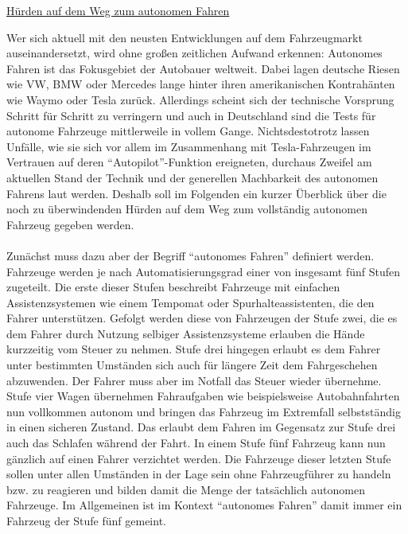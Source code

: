 \documentclass[10pt,a4paper]{article}
\begin{document}
\noindent
\begin{center}
\begin{huge}
\underline{Hürden auf dem Weg zum autonomen Fahren}
\end{huge}
\end{center}
\vspace{10mm}
\noindent
Wer sich aktuell mit den neusten Entwicklungen auf dem Fahrzeugmarkt auseinandersetzt, wird ohne großen zeitlichen Aufwand erkennen: Autonomes Fahren ist das Fokusgebiet der Autobauer weltweit. Dabei lagen deutsche Riesen wie VW, BMW oder Mercedes lange hinter ihren amerikanischen Kontrahänten wie Waymo oder Tesla zurück. Allerdings scheint sich der technische Vorsprung Schritt für Schritt zu verringern und auch in Deutschland sind die Tests für autonome Fahrzeuge mittlerweile in vollem Gange. Nichtsdestotrotz lassen Unfälle, wie sie sich vor allem im Zusammenhang mit Tesla-Fahrzeugen im Vertrauen auf deren ``Autopilot''-Funktion ereigneten, durchaus Zweifel am aktuellen Stand der Technik und der generellen Machbarkeit des autonomen Fahrens laut werden. Deshalb soll im Folgenden ein kurzer Überblick über die noch zu überwindenden Hürden auf dem Weg zum vollständig autonomen Fahrzeug gegeben werden.\cite{StandAutonomesFahren}
\\
\\
Zunächst muss dazu aber der Begriff ``autonomes Fahren'' definiert werden. Fahrzeuge werden je nach Automatisierungsgrad einer von insgesamt fünf Stufen zugeteilt. Die erste dieser Stufen beschreibt Fahrzeuge mit einfachen Assistenzsystemen wie einem Tempomat oder Spurhalteassistenten, die den Fahrer unterstützen. Gefolgt werden diese von Fahrzeugen der Stufe zwei, die es dem Fahrer durch Nutzung selbiger Assistenzsysteme erlauben die Hände kurzzeitig vom Steuer zu nehmen. Stufe drei hingegen erlaubt es dem Fahrer unter bestimmten Umständen sich auch für längere Zeit dem Fahrgeschehen abzuwenden. Der Fahrer muss aber im Notfall das Steuer wieder übernehme. Stufe vier Wagen übernehmen Fahraufgaben wie beispielsweise Autobahnfahrten nun vollkommen autonom und bringen das Fahrzeug im Extremfall selbstständig in einen sicheren Zustand. Das erlaubt dem Fahren im Gegensatz zur Stufe drei auch das Schlafen während der Fahrt. In einem Stufe fünf Fahrzeug kann nun gänzlich auf einen Fahrer verzichtet werden. Die Fahrzeuge dieser letzten Stufe sollen unter allen Umständen in der Lage sein ohne Fahrzeugführer zu handeln bzw. zu reagieren und bilden damit die Menge der tatsächlich autonomen Fahrzeuge. Im Allgemeinen ist im Kontext ``autonomes Fahren'' damit immer ein Fahrzeug der Stufe fünf gemeint.\cite{5Stages}
\end{document}
